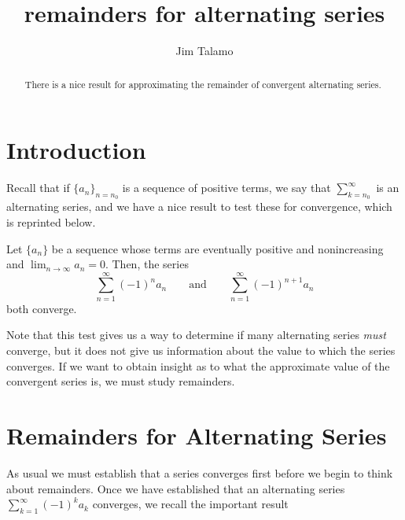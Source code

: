 \documentclass{ximera}
\title[Dig-In:]{remainders for alternating series}
\author{Jim Talamo}
\begin{document}
\begin{abstract}
There is a nice result for approximating the remainder of convergent alternating series. 
\end{abstract}
\maketitle

\section{Introduction}
Recall that if $\{a_n\}_{n=n_0}$ is a sequence of positive terms, we say that $\sum_{k=n_0}^{\infty}$ is an alternating series, and we have a nice result to test these for convergence, which is reprinted below.

\begin{theorem}
Let $\{a_n\}$ be a sequence whose terms are eventually positive and nonincreasing and
$\lim_{n\to\infty}a_n=0$. Then, the series 
\[
\sum_{n=1}^\infty (-1)^{n}a_n \qquad \text{and}\qquad \sum_{n=1}^\infty (-1)^{n+1}a_n 
\]
both converge.
\end{theorem}


Note that this test gives us a way to determine if many alternating series \emph{must} converge, but it does not give us information about the value to which the series converges.  If we want to obtain insight as to what the approximate value of the convergent series is, we must study remainders.

  



\section{Remainders for Alternating Series}
As usual we must establish that a series converges first before we begin to think about remainders.  Once we have established that an alternating series $\sum_{k=1}^{\infty} (-1)^k a_k$ converges, we recall the important result

\begin{image}
  \end{image}
\end{document}
